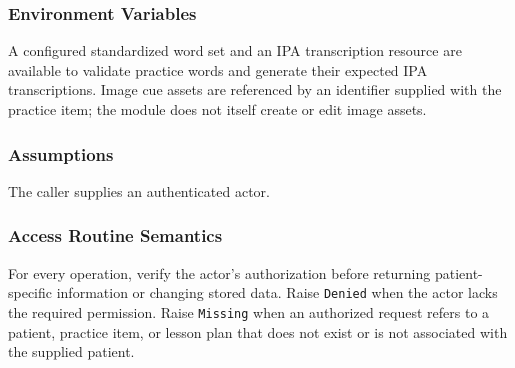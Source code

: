 \documentclass[12pt, titlepage]{article}
\begin{document}
\subsubsection{Environment Variables}
A configured standardized word set and an IPA transcription resource are
available to validate practice words and generate their expected IPA
transcriptions. Image cue assets are referenced by an identifier supplied
with the practice item; the module does not itself create or edit image
assets.

\subsubsection{Assumptions}
The caller supplies an authenticated actor. 

\subsubsection{Access Routine Semantics}
For every operation, verify the actor's authorization before returning
patient-specific information or changing stored data. Raise \texttt{Denied}
when the actor lacks the required permission. Raise \texttt{Missing} when
an authorized request refers to a patient, practice item, or lesson plan
that does not exist or is not associated with the supplied patient.
\end{document}
